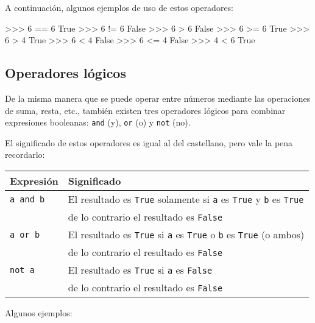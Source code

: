 A continuación, algunos ejemplos de uso de estos operadores:

\begin{codigo-python-sn}
>>> 6 == 6
True
>>> 6 != 6
False
>>> 6 > 6
False
>>> 6 >= 6
True
>>> 6 > 4
True
>>> 6 < 4
False
>>> 6 <= 4
False
>>> 4 < 6
True
\end{codigo-python-sn}

\subsection{Operadores lógicos}

De la misma manera que se puede operar entre números mediante las
operaciones de suma, resta, etc., también existen tres operadores lógicos
para combinar expresiones booleanas: \lstinline!and! (y), \lstinline!or!
(o) y \lstinline!not! (no).

El significado de estos operadores es igual al del castellano, pero vale la pena recordarlo:

\newcommand{\tablaOperadoresLogicos}{
\begin{center}
\begin{tabular}[c]{l l}
{\bf Expresión} & {\bf Significado}\\
\hline
\lstinline!a and b!& El resultado es \lstinline!True! solamente si
\lstinline!a! es \lstinline!True! y  \lstinline!b! es \lstinline!True! \\
& de lo contrario el resultado es \lstinline!False!\\
\lstinline!a or b!& El resultado es \lstinline!True! si \lstinline!a! es
\lstinline!True! o  \lstinline!b! es \lstinline!True! (o ambos) \\
& de lo contrario el resultado es \lstinline!False!\\
\lstinline!not a!& El resultado es \lstinline!True! si \lstinline!a! es
\lstinline!False!\\
& de lo contrario el resultado es \lstinline!False!\\
\end{tabular}
\end{center}
}
\tablaOperadoresLogicos

Algunos ejemplos:

